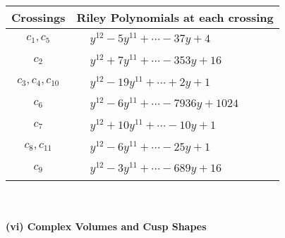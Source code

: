 \documentclass[1p]{elsarticle_modified}
\theoremstyle{definition}
\begin{document}
\begin{tabular}{m{50pt}|m{274pt}}
Crossings & \hspace{64pt}Riley Polynomials at each crossing \\
\hline $$\begin{aligned}c_{1},c_{5}\end{aligned}$$&$\begin{aligned}
&y^{12}-5 y^{11}+\cdots-37 y+4
\end{aligned}$\\
\hline $$\begin{aligned}c_{2}\end{aligned}$$&$\begin{aligned}
&y^{12}+7 y^{11}+\cdots-353 y+16
\end{aligned}$\\
\hline $$\begin{aligned}c_{3},c_{4},c_{10}\end{aligned}$$&$\begin{aligned}
&y^{12}-19 y^{11}+\cdots+2 y+1
\end{aligned}$\\
\hline $$\begin{aligned}c_{6}\end{aligned}$$&$\begin{aligned}
&y^{12}-6 y^{11}+\cdots-7936 y+1024
\end{aligned}$\\
\hline $$\begin{aligned}c_{7}\end{aligned}$$&$\begin{aligned}
&y^{12}+10 y^{11}+\cdots-10 y+1
\end{aligned}$\\
\hline $$\begin{aligned}c_{8},c_{11}\end{aligned}$$&$\begin{aligned}
&y^{12}-6 y^{11}+\cdots-25 y+1
\end{aligned}$\\
\hline $$\begin{aligned}c_{9}\end{aligned}$$&$\begin{aligned}
&y^{12}-3 y^{11}+\cdots-689 y+16
\end{aligned}$\\
\hline
\end{tabular}\\~\\
\newpage\flushleft \textbf{(vi) Complex Volumes and Cusp Shapes}
\end{document}
